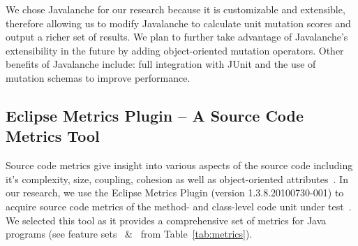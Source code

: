 \documentclass[10pt,conference,compsocconf]{IEEEtran}
\begin{document}
We chose Javalanche for our research because it is customizable and extensible, therefore allowing us to modify Javalanche to calculate unit mutation scores and output a richer set of results. We plan to further take advantage of Javalanche's extensibility in the future by adding object-oriented mutation operators. Other benefits of Javalanche include: full integration with JUnit and the use of mutation schemas to improve performance.

\subsection{Eclipse Metrics Plugin -- A Source Code Metrics Tool}
\label{subsec:Metrics}
Source code metrics give insight into various aspects of the source code including it's complexity, size, coupling, cohesion as well as object-oriented attributes~\cite{SCE05,McCa76,Kan02,HWY09,Hend95,SRD12}. In our research, we use the Eclipse Metrics Plugin (version 1.3.8.20100730-001) to acquire source code metrics of the method- and class-level code unit under test~\cite{Metrics}. We selected this tool as it provides a comprehensive set of metrics for Java programs (see feature sets ~\&~ from Table~\ref{tab:metrics}).
\end{document}
